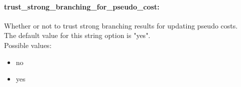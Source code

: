 \paragraph{trust\_strong\_branching\_for\_pseudo\_cost:}\label{opt:trust_strong_branching_for_pseudo_cost} Whether or not to trust strong branching results for updating pseudo costs. \\
 The default value for this string option is "yes".
\\ 
Possible values:
\begin{itemize}
   \item no
   \item yes
\end{itemize}

